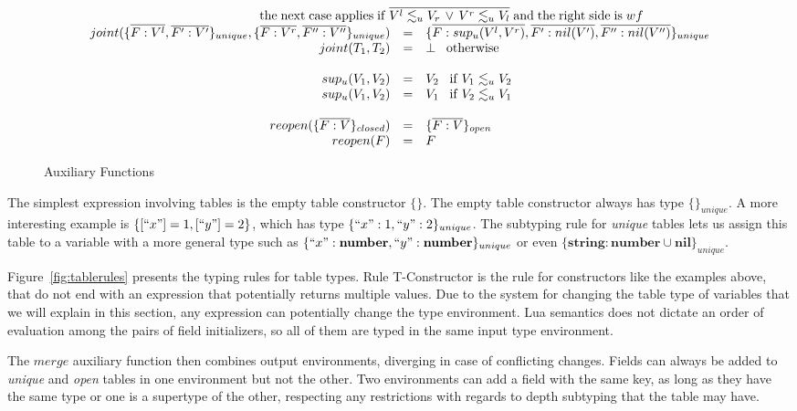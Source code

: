 \documentclass[preprint]{sigplanconf}
\newcommand{\Nil}{\mathbf{nil}}
\newcommand{\Number}{\mathbf{number}}
\newcommand{\String}{\mathbf{string}}
\begin{document}
\begin{figure*}
{\[\begin{array}{rcl}
	\multicolumn{3}{c}{\;\;\;\;\;\;\;\;\;\;\;\;\;\;\;\;\;\;\;\;\;\;\;\;\;\;\;\;\;\mathrm{the\;next\;case\;applies\;if}\;
		\overline{V^l \lesssim_u V_r \,\vee\, V^r \lesssim_u V_l}\;\mathrm{and\;the\;right\; side\; is\;}wf}\\
	joint(\{\overline{F:V^l},\overline{F^{\prime}:V^{\prime}}\}_{unique},
	\{\overline{F:V^r},\overline{F^{\prime\prime}:V^{\prime\prime}}\}_{unique}) &=&
	\{\overline{F:sup_u(V^l,V^r)},\overline{F^\prime:nil(V^\prime)},\overline{F^{\prime\prime}:nil(V^{\prime\prime})}\}_{unique}\\
	joint(T_1, T_2) & = & \bot \;\;\; \mathrm{otherwise}\\\\
	sup_u(V_1, V_2) & = & V_2 \;\;\; \mathrm{if}\; V_1 \lesssim_u V_2\\
	sup_u(V_1, V_2) & = & V_1 \;\;\; \mathrm{if}\; V_2 \lesssim_u V_1\\\\
	reopen(\{\overline{F:V}\}_{closed}) & = & \{\overline{F:V}\}_{open} \\
	reopen(F) & = & F
	\end{array}
	\]}
	\caption{Auxiliary Functions}
\label{fig:funcs}
\end{figure*}

The simplest expression involving tables is the empty
table constructor $\{\}$. The empty table constructor always
has type $\{\}_{unique}$. A more interesting example is $\{ [``x"] = 1, [``y"] = 2 \}$, which has type $\{ ``x":1 , ``y": 2 \}_{unique}$. The subtyping rule for {\em unique} tables lets
us assign this table to a variable with a more general
type such as $\{ ``x":\Number , ``y": \Number \}_{unique}$ or
even $\{ \String:\Number \cup \Nil \}_{unique}$. 

Figure~\ref{fig:tablerules} presents the typing rules for table types.
Rule {\sc T-Constructor} is the rule for constructors
like the examples above, that
do not end with an expression that potentially returns
multiple values.
Due to the system for changing the table type of variables that
we will explain in this section, any expression can potentially
change the type environment. Lua semantics does not dictate
an order of evaluation among the pairs of field initializers,
so all of them are typed in the same input type environment.

The $merge$ auxiliary function then combines output
environments, diverging in case of conflicting changes.
Fields can always be added to {\em unique} and {\em open}
tables in one environment but not the other. Two environments
can add a field with the same key, as long as they have
the same type or one is a supertype of the other, respecting
any restrictions with regards to depth subtyping that the table may have.  
\end{document}
